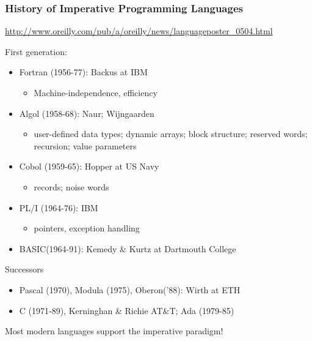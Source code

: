 \documentclass{beamer}
\begin{document}
\begin{frame}[fragile]
\frametitle{History of Imperative Programming Languages}
\url{http://www.oreilly.com/pub/a/oreilly/news/languageposter_0504.html}

First generation:
\begin{itemize}
\item Fortran (1956-77): Backus at IBM
\begin{itemize}
\item Machine-independence, efficiency 
\end{itemize}
\item Algol (1958-68): Naur; Wijngaarden
\begin{itemize}
\item user-defined data types; dynamic arrays; block structure;
reserved words; recursion; value parameters
\end{itemize}
\item Cobol (1959-65):  Hopper at US Navy
\begin{itemize}
\item records; noise words
\end{itemize}
\item PL/I (1964-76):  IBM
\begin{itemize}
\item pointers, exception handling 
\end{itemize} 
\item BASIC(1964-91): Kemedy \& Kurtz at Dartmouth College
\end{itemize}
Successors
\begin{itemize}
\item Pascal (1970), Modula (1975), Oberon('88): Wirth at ETH 
\item C (1971-89), Kerninghan \& Richie AT\&T;  Ada (1979-85)
\end{itemize}
Most modern languages support the imperative paradigm!
\end{frame}
\end{document}
